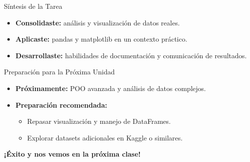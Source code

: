 \documentclass[10pt]{beamer}
\begin{document}
\begin{frame}{Síntesis de la Tarea}
  \begin{itemize}
    \item \textbf{Consolidaste:} análisis y visualización de datos reales.
    \item \textbf{Aplicaste:} pandas y matplotlib en un contexto práctico.
    \item \textbf{Desarrollaste:} habilidades de documentación y comunicación de resultados.
  \end{itemize}
\end{frame}

\begin{frame}{Preparación para la Próxima Unidad}
  \begin{itemize}
    \item \textbf{Próximamente:} POO avanzada y análisis de datos complejos.
    \item \textbf{Preparación recomendada:}
      \begin{itemize}
        \item Repasar visualización y manejo de DataFrames.
        \item Explorar datasets adicionales en Kaggle o similares.
      \end{itemize}
  \end{itemize}
  \begin{center}
    \textbf{¡Éxito y nos vemos en la próxima clase!}
  \end{center}
\end{frame}
\end{document}
